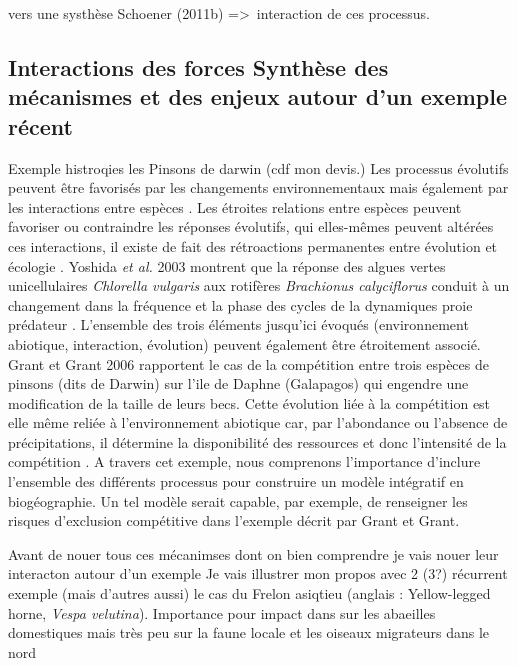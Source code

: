 vers une systhèse Schoener (2011b) =\textgreater{}~interaction de ces
processus.

\subsection*{Interactions des forces Synthèse des mécanismes et des
enjeux autour d'un exemple
récent}\label{interactions-des-forces-synthuxe8se-des-muxe9canismes-et-des-enjeux-autour-dun-exemple-ruxe9cent}

Exemple histroqies les Pinsons de darwin (cdf mon devis.) Les processus
évolutifs peuvent être favorisés par les changements environnementaux
mais également par les interactions entre espèces \cite{Tingley2009}.
Les étroites relations entre espèces peuvent favoriser ou contraindre
les réponses évolutifs, qui elles-mêmes peuvent altérées ces
interactions, il existe de fait des rétroactions permanentes entre
évolution et écologie \cite{Post2009}. Yoshida \textit{et al.} 2003
montrent que la réponse des algues vertes unicellulaires
\textit{Chlorella vulgaris} aux rotifères
\textit{Brachionus calyciflorus} conduit à un changement dans la
fréquence et la phase des cycles de la dynamiques proie prédateur
\cite{Yoshida2003}. L'ensemble des trois éléments jusqu'ici évoqués
(environnement abiotique, interaction, évolution) peuvent également être
étroitement associé. Grant et Grant 2006 rapportent le cas de la
compétition entre trois espèces de pinsons (dits de Darwin) sur l'ile de
Daphne (Galapagos) qui engendre une modification de la taille de leurs
becs. Cette évolution liée à la compétition est elle même reliée à
l'environnement abiotique car, par l'abondance ou l'absence de
précipitations, il détermine la disponibilité des ressources et donc
l'intensité de la compétition \cite{Grant2006}. A travers cet exemple,
nous comprenons l'importance d'inclure l'ensemble des différents
processus pour construire un modèle intégratif en biogéographie. Un tel
modèle serait capable, par exemple, de renseigner les risques
d'exclusion compétitive dans l'exemple décrit par Grant et Grant.

Avant de nouer tous ces mécanimses dont on bien comprendre je vais nouer
leur interacton autour d'un exemple Je vais illustrer mon propos avec 2
(3?) récurrent exemple (mais d'autres aussi) le cas du Frelon asiqtieu
(anglais : Yellow-legged horne, \emph{Vespa velutina}). Importance pour
impact dans sur les abaeilles domestiques mais très peu sur la faune
locale et les oiseaux migrateurs dans le nord

